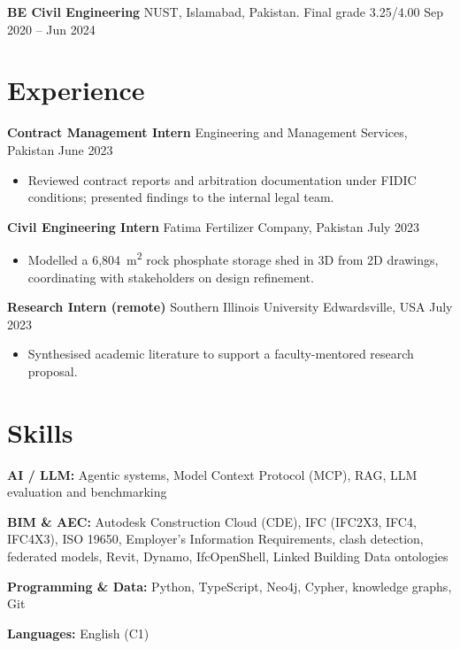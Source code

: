 \documentclass[a4paper,10.5pt]{article}
\newcommand{\datefill}{\dotfill}
\newcommand{\entry}[3]{\vspace{2.5pt}\noindent\textbf{#1} \textbar{} #2 \datefill{} #3\par\vspace{0.5pt}}
\newcommand{\skillrow}[2]{\noindent\textbf{#1:} #2\par\vspace{1pt}}
\begin{document}
\entry{BE Civil Engineering}{NUST, Islamabad, Pakistan. Final grade 3.25/4.00}{Sep 2020 -- Jun 2024}

\section{Experience}
\entry{Contract Management Intern}{Engineering and Management Services, Pakistan}{June 2023}
\begin{itemize}
  \item Reviewed contract reports and arbitration documentation under FIDIC
        conditions; presented findings to the internal legal team.
\end{itemize}

\entry{Civil Engineering Intern}{Fatima Fertilizer Company, Pakistan}{July 2023}
\begin{itemize}
  \item Modelled a 6,804~m\textsuperscript{2} rock phosphate storage shed in 3D from
        2D drawings, coordinating with stakeholders on design refinement.
\end{itemize}

\entry{Research Intern (remote)}{Southern Illinois University Edwardsville, USA}{July 2023}
\begin{itemize}
  \item Synthesised academic literature to support a faculty-mentored research proposal.
\end{itemize}

\section{Skills}

\skillrow{AI / LLM}{Agentic systems, Model Context Protocol (MCP), RAG, LLM evaluation and benchmarking}
\skillrow{BIM \& AEC}{Autodesk Construction Cloud (CDE), IFC (IFC2X3, IFC4, IFC4X3), ISO 19650, Employer's Information Requirements, clash detection, federated models, Revit, Dynamo, IfcOpenShell, Linked Building Data ontologies}
\skillrow{Programming \& Data}{Python, TypeScript, Neo4j, Cypher, knowledge graphs, Git}

\skillrow{Languages}{English (C1)}
\end{document}
